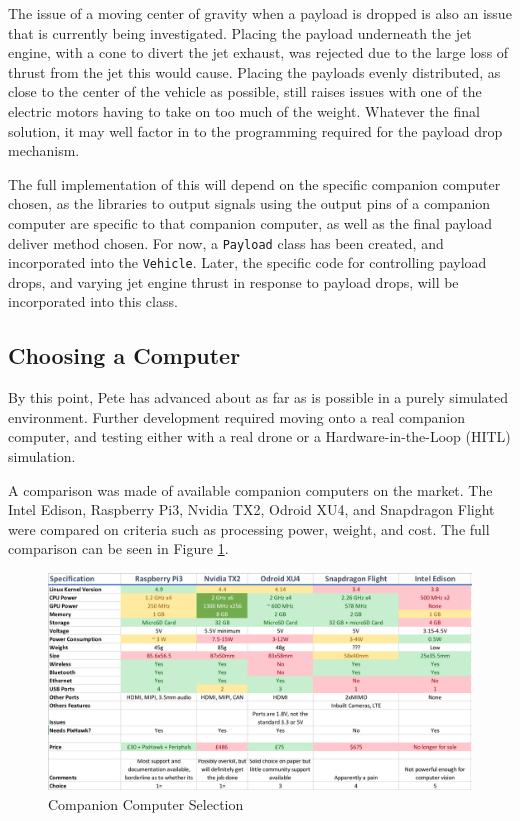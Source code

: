 \documentclass[11pt]{article}
\begin{document}
The issue of a moving center of gravity when a payload is dropped is also an issue that is currently being investigated. Placing the payload underneath the jet engine, with a cone to divert the jet exhaust, was rejected due to the large loss of thrust from the jet this would cause. Placing the payloads evenly distributed, as close to the center of the vehicle as possible, still raises issues with one of the electric motors having to take on too much of the weight. Whatever the final solution, it may well factor in to the programming required for the payload drop mechanism. \label{payload_delivery}

The full implementation of this will depend on the specific companion computer chosen, as the libraries to output signals using the output pins of a companion computer are specific to that companion computer, as well as the final payload deliver method chosen. For now, a \lstinline|Payload| class has been created, and incorporated into the \lstinline|Vehicle|. Later, the specific code for controlling payload drops, and varying jet engine thrust in response to payload drops, will be incorporated into this class.

\subsection{Choosing a Computer} \label{cc_selection}
By this point, Pete has advanced about as far as is possible in a purely simulated environment. Further development required moving onto a real companion computer, and testing either with a real drone or a Hardware-in-the-Loop (HITL) simulation.

A comparison was made of available companion computers on the market. The Intel Edison, Raspberry Pi3, Nvidia TX2, Odroid XU4, and Snapdragon Flight were compared on criteria such as processing power, weight, and cost. The full comparison can be seen in Figure \ref{fig:cc_selection}.

\begin{figure}[h]
    \includegraphics[width=\linewidth]{companion_computer_comparison}
    \caption{Companion Computer Selection} \label{fig:cc_selection}
\end{figure}
\end{document}
